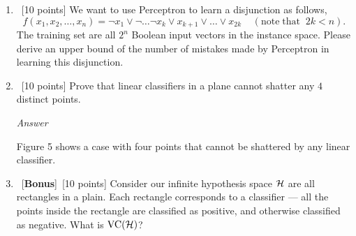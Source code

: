 \documentclass[12pt, fullpage,letterpaper]{article}
\begin{document}
\begin{enumerate}
	\item~[10 points] We want to use Perceptron to learn a disjunction as follows,
	\[
	f(x_1, x_2, \ldots, x_n) = \neg x_1 \lor \neg \ldots \neg x_k \lor x_{k+1} \lor \ldots \lor x_{2k} \;\;\;\;(\mathrm{note\; that}\;\; 2k < n).
	\]
	The training set are all $2^n$ Boolean input vectors in the instance space. 
	Please derive an upper bound of the number of mistakes made by Perceptron in learning this disjunction.

	\item~[10 points] Prove that linear classifiers in a plane cannot shatter any $4$ distinct points. 
	
	\emph{Answer}
	
	Figure 5 shows a case with four points that cannot be shattered by any linear classifier.
	
	\item~[\textbf{Bonus}]~[10 points] Consider our infinite hypothesis space $\mathcal{H}$ are all rectangles in a plain. Each rectangle corresponds to a classifier --- all the points inside the rectangle are classified as positive, and otherwise classified as negative. What is $\mathrm{VC}(\mathcal{H})$? 


\end{enumerate}
\end{document}
